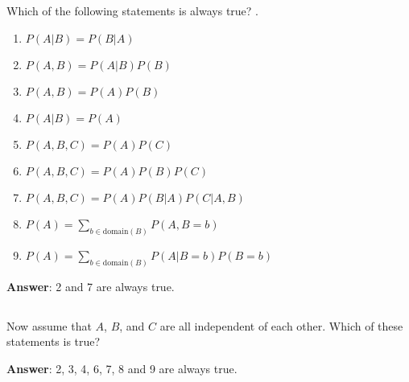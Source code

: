 \documentclass[11pt,letterpaper]{article}
\theoremstyle{definition}
\begin{document}

\subsection{}
Which of the following statements is always true? .

\begin{enumerate}
\item $P(A|B) = P(B|A)$
\item $P(A,B) = P(A|B) P(B)$
\item $P(A,B) = P(A) P(B)$
\item $P(A|B) = P(A)$
\item $P(A,B,C) = P(A) P(C)$
\item $P(A,B,C) = P(A) P(B) P(C)$
\item $P(A,B,C) = P(A) P(B|A) P(C|A,B)$
\item $P(A) = \sum_{b \in \text{domain}(B)} P(A, B=b)$
\item $P(A) = \sum_{b \in \text{domain}(B)} P(A | B=b) P(B=b)$
\end{enumerate}

\textbf{Answer}: 2 and 7 are always true.

\subsection{}
Now assume that $A$, $B$, and $C$ are all independent of each other.
Which of these statements is true?

\textbf{Answer}: 2, 3, 4, 6, 7, 8 and 9 are always true.
\end{document}
